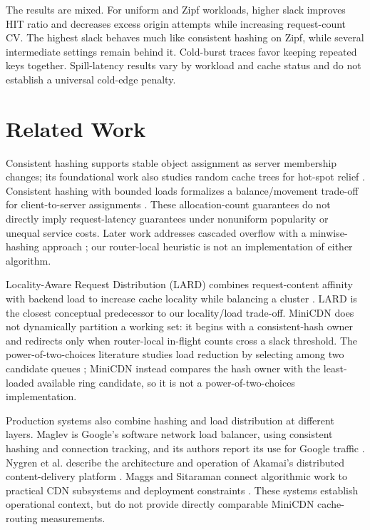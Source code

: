 \documentclass[conference]{IEEEtran}
\begin{document}
The results are mixed. For uniform and Zipf workloads, higher slack improves
HIT ratio and decreases excess origin attempts while increasing request-count
CV. The highest slack behaves much like consistent hashing on Zipf, while
several intermediate settings remain behind it. Cold-burst traces favor
keeping repeated keys together. Spill-latency results vary by workload and
cache status and do not establish a universal cold-edge penalty.

\section{Related Work}
Consistent hashing supports stable object assignment as server membership
changes; its foundational work also studies random cache trees for hot-spot
relief \cite{karger1997consistent}. Consistent hashing with bounded loads
formalizes a balance/movement trade-off for client-to-server assignments
\cite{mirrokni2018bounded}. These allocation-count guarantees do not directly
imply request-latency guarantees under nonuniform popularity or unequal
service costs. Later work addresses cascaded overflow with a minwise-hashing
approach \cite{chen2021revisiting}; our router-local heuristic is not an
implementation of either algorithm.

Locality-Aware Request Distribution (LARD) combines request-content affinity
with backend load to increase cache locality while balancing a cluster
\cite{pai1998lard}. LARD is the closest conceptual predecessor to our
locality/load trade-off. MiniCDN does not dynamically partition a working set:
it begins with a consistent-hash owner and redirects only when router-local
in-flight counts cross a slack threshold. The power-of-two-choices literature
studies load reduction by selecting among two candidate queues
\cite{mitzenmacher2001power}; MiniCDN instead compares the hash owner with the
least-loaded available ring candidate, so it is not a power-of-two-choices
implementation.

Production systems also combine hashing and load distribution at different
layers. Maglev is Google's software network load balancer, using consistent
hashing and connection tracking, and its authors report its use for Google
traffic \cite{eisenbud2016maglev}. Nygren et al. describe the architecture
and operation of Akamai's distributed content-delivery platform
\cite{nygren2010akamai}. Maggs and Sitaraman connect algorithmic work to
practical CDN subsystems and deployment constraints \cite{maggs2015nuggets}.
These systems establish operational context, but do not provide directly
comparable MiniCDN cache-routing measurements.
\end{document}
